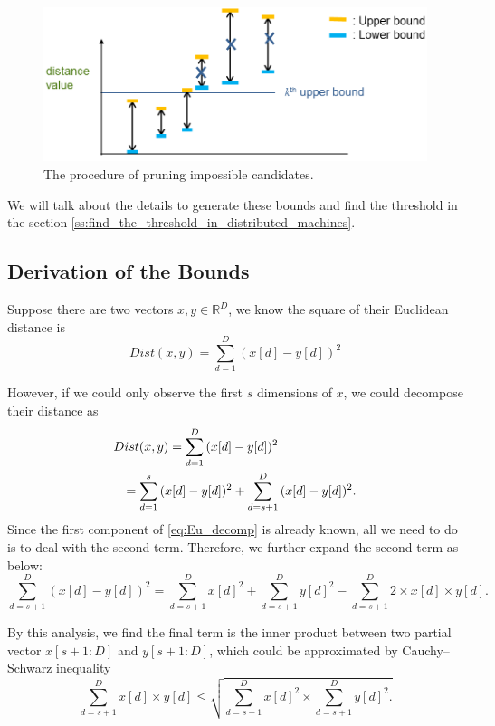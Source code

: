 \begin{figure}[htpb!]
  \centering
    \includegraphics[width=1.0\textwidth]{fig/prune.png}
    \caption{\label{fig:flow}The procedure of pruning impossible candidates.}
\end{figure}

We will talk about the details to generate these bounds and find the threshold in the section \ref{ss:find_the_threshold_in_distributed_machines}.


\subsection{Derivation of the Bounds} %
\label{ss:derivation_of_the_bounds}

Suppose there are two vectors $x,y\in \mathbb{R}^D$, we know the square of their Euclidean distance is 
\begin{equation}
	Dist(x,y)=\sum^D_{d=1}{(x[d]-y[d])^2}
\end{equation}

However, if we could only observe the first $s$ dimensions of $x$, we could decompose their distance as 
{
\begin{eqnarray*}
\lefteqn{Dist(x,y)=\sum^D_{d=1}{(x[d]-y[d])^2} } \\
			& &	=\sum^s_{d=1}{(x[d]-y[d])^2} + \sum^D_{d=s+1}{(x[d]-y[d])^2.}	
\end{eqnarray*}
}
Since the first component of \eqref{eq:Eu_decomp} is already known, all we need to do is to deal with the second term. Therefore, we further expand the second term as below:
\[
\sum^D_{d=s+1}{(x[d]-y[d])^2}=\sum^D_{d=s+1}{x[d]^2}+\sum^D_{d=s+1}{y[d]^2}-\sum^D_{d=s+1}{2\times x[d]\times y[d].}
\]

By this analysis, we find the final term is the inner product between two partial vector $x[s+1:D]$ and $y[s+1:D]$, which could be approximated by Cauchy–Schwarz inequality
\begin{equation}\label{eq:Cauchy}
	\sum^D_{d=s+1}{x[d]\times y[d]} \leq \sqrt{\sum^D_{d=s+1}{x[d]^2}\times \sum^D_{d=s+1}{y[d]^2}.}
\end{equation}

